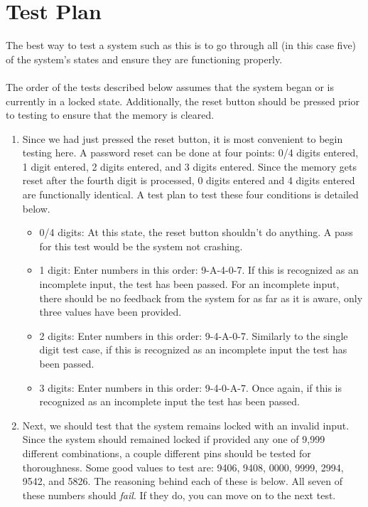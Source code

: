 \documentclass[10pt,a4paper]{article}
\begin{document}
\section{Test Plan}
The best way to test a system such as this is to go through all (in this case five) of the system's states and ensure they are functioning properly. \\~\\
The order of the tests described below assumes that the system began or is currently in a locked state. Additionally, the reset button should be pressed prior to testing to ensure that the memory is cleared. 
\begin{enumerate}
	\item Since we had just pressed the reset button, it is most convenient to begin testing here. A password reset can be done at four points: 0/4 digits entered, 1 digit entered, 2 digits entered, and 3 digits entered. Since the memory gets reset after the fourth digit is processed, 0 digits entered and 4 digits entered are functionally identical. A test plan to test these four conditions is detailed below.
	\begin{itemize}
		\item 0/4 digits: At this state, the reset button shouldn't do anything. A pass for this test would be the system not crashing. 
		\item 1 digit: Enter numbers in this order: 9-A-4-0-7. If this is recognized as an incomplete input, the test has been passed. For an incomplete input, there should be no feedback from the system for as far as it is aware, only three values have been provided. 
		\item 2 digits: Enter numbers in this order: 9-4-A-0-7. Similarly to the single digit test case, if this is recognized as an incomplete input the test has been passed.
		\item 3 digits: Enter numbers in this order: 9-4-0-A-7. Once again, if this is recognized as an incomplete input the test has been passed.
	\end{itemize}
	\item Next, we should test that the system remains locked with an invalid input. Since the system should remained locked if provided any one of 9,999 different combinations, a couple different pins should be tested for thoroughness. Some good values to test are: 9406, 9408, 0000, 9999, 2994, 9542, and 5826. The reasoning behind each of these is below. All seven of these numbers should \textit{fail}. If they do, you can move on to the next test. 

\end{enumerate}
\end{document}
